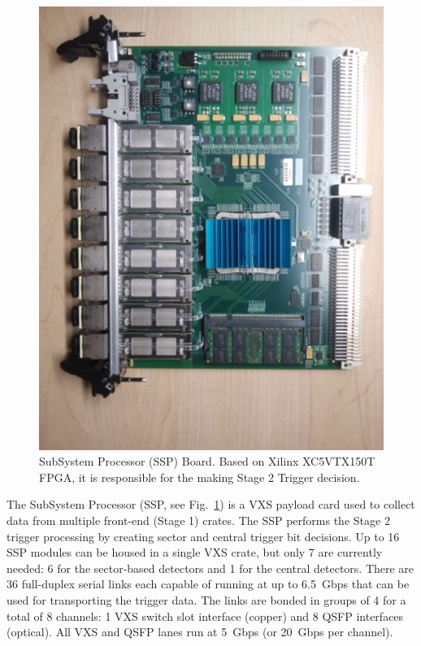 \begin{figure}[hbt]
	\centering
	\includegraphics[width=1.0\columnwidth,keepaspectratio]{img/ssp_board.png}
	\caption{SubSystem Processor (SSP) Board. Based on Xilinx XC5VTX150T FPGA, it is responsible for the making Stage 2 Trigger decision.}
	\label{fig:ssp_board}
\end{figure}

The SubSystem Processor (SSP, see Fig.~\ref{fig:ssp_board}) is a VXS payload card used to collect data from multiple front-end (Stage 1) crates. The SSP performs the Stage 2 trigger processing by creating sector and central trigger bit decisions. Up to 16 SSP modules can be housed in a single VXS crate, but only 7 are currently needed: 6 for the sector-based detectors and 1 for the central detectors. There are 36 full-duplex serial links each capable of running at up to 6.5~Gbps that can be used for transporting the trigger data. The links are bonded in groups of 4 for a total of 8 channels: 1 VXS switch slot interface (copper) and 8 QSFP interfaces (optical). All VXS and QSFP lanes run at 5~Gbps (or 20~Gbps per channel).

